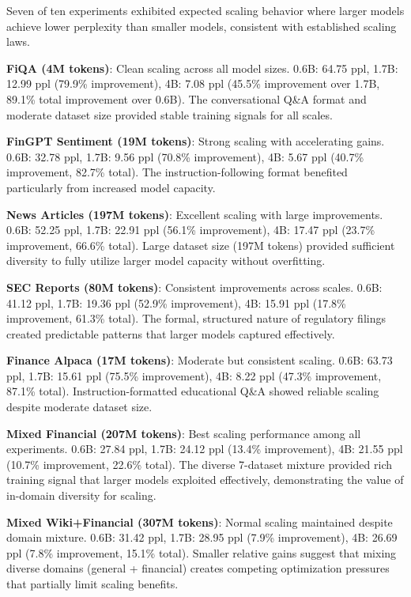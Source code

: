 Seven of ten experiments exhibited expected scaling behavior where larger models achieve lower perplexity than smaller models, consistent with established scaling laws.

\textbf{FiQA (4M tokens)}: Clean scaling across all model sizes. 0.6B: 64.75 ppl, 1.7B: 12.99 ppl (79.9\% improvement), 4B: 7.08 ppl (45.5\% improvement over 1.7B, 89.1\% total improvement over 0.6B). The conversational Q\&A format and moderate dataset size provided stable training signals for all scales.

\textbf{FinGPT Sentiment (19M tokens)}: Strong scaling with accelerating gains. 0.6B: 32.78 ppl, 1.7B: 9.56 ppl (70.8\% improvement), 4B: 5.67 ppl (40.7\% improvement, 82.7\% total). The instruction-following format benefited particularly from increased model capacity.

\textbf{News Articles (197M tokens)}: Excellent scaling with large improvements. 0.6B: 52.25 ppl, 1.7B: 22.91 ppl (56.1\% improvement), 4B: 17.47 ppl (23.7\% improvement, 66.6\% total). Large dataset size (197M tokens) provided sufficient diversity to fully utilize larger model capacity without overfitting.

\textbf{SEC Reports (80M tokens)}: Consistent improvements across scales. 0.6B: 41.12 ppl, 1.7B: 19.36 ppl (52.9\% improvement), 4B: 15.91 ppl (17.8\% improvement, 61.3\% total). The formal, structured nature of regulatory filings created predictable patterns that larger models captured effectively.

\textbf{Finance Alpaca (17M tokens)}: Moderate but consistent scaling. 0.6B: 63.73 ppl, 1.7B: 15.61 ppl (75.5\% improvement), 4B: 8.22 ppl (47.3\% improvement, 87.1\% total). Instruction-formatted educational Q\&A showed reliable scaling despite moderate dataset size.

\textbf{Mixed Financial (207M tokens)}: Best scaling performance among all experiments. 0.6B: 27.84 ppl, 1.7B: 24.12 ppl (13.4\% improvement), 4B: 21.55 ppl (10.7\% improvement, 22.6\% total). The diverse 7-dataset mixture provided rich training signal that larger models exploited effectively, demonstrating the value of in-domain diversity for scaling.

\textbf{Mixed Wiki+Financial (307M tokens)}: Normal scaling maintained despite domain mixture. 0.6B: 31.42 ppl, 1.7B: 28.95 ppl (7.9\% improvement), 4B: 26.69 ppl (7.8\% improvement, 15.1\% total). Smaller relative gains suggest that mixing diverse domains (general + financial) creates competing optimization pressures that partially limit scaling benefits.

